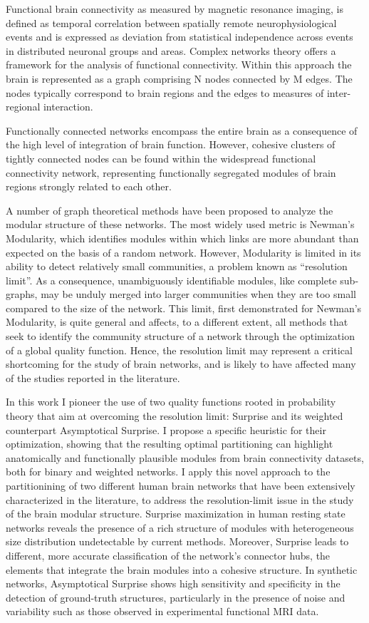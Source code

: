 Functional brain connectivity as measured by magnetic resonance imaging, is defined as temporal correlation between spatially remote neurophysiological events and is expressed as deviation from statistical independence across events in distributed neuronal groups and areas.
Complex networks theory offers a framework for the analysis of functional connectivity.
Within this approach the brain is represented as a graph comprising N nodes connected by M edges.
The nodes typically correspond to brain regions and the edges to measures of inter-regional interaction.

Functionally connected networks encompass the entire brain as a consequence of the high level of integration of brain function.
However, cohesive clusters of tightly connected nodes can be found within the widespread functional connectivity network, representing functionally segregated modules of brain regions strongly related to each other.

A number of graph theoretical methods have been proposed to analyze the modular structure of these networks.
The most widely used metric is Newman's Modularity, which identifies modules within which links are more abundant than expected on the basis of a random network.
However, Modularity is limited in its ability to detect relatively small communities, a problem known as ``resolution limit''.
As a consequence, unambiguously identifiable modules, like complete sub-graphs, may be unduly merged into larger communities when they are too small compared to the size of the network.
This limit, first demonstrated for Newman's Modularity, is quite general and affects, to a different extent, all methods that seek to identify the community structure of a network through the optimization of a global quality function.
Hence, the resolution limit may represent a critical shortcoming for the study of brain networks, and is likely to have affected many of the studies reported in the literature.

In this work I pioneer the use of two quality functions rooted in probability theory that aim at overcoming the resolution limit: Surprise and its weighted counterpart Asymptotical Surprise.
I propose a specific heuristic for their optimization, showing that the resulting optimal partitioning can highlight anatomically and functionally plausible modules from brain connectivity datasets, both for binary and weighted networks. 
I apply this novel approach to the partitionining of two different human brain networks that have been extensively characterized in the literature, to address the resolution-limit issue in the study of the brain modular structure.
Surprise maximization in human resting state networks reveals the presence of a rich structure of modules with heterogeneous size distribution undetectable by current methods. Moreover, Surprise leads to different, more accurate classification of the network's connector hubs, the elements that integrate the brain modules into a cohesive structure.
In synthetic networks, Asymptotical Surprise shows high sensitivity and specificity in the detection of ground-truth structures, particularly in the presence of noise and variability such as those observed in experimental functional MRI data.

